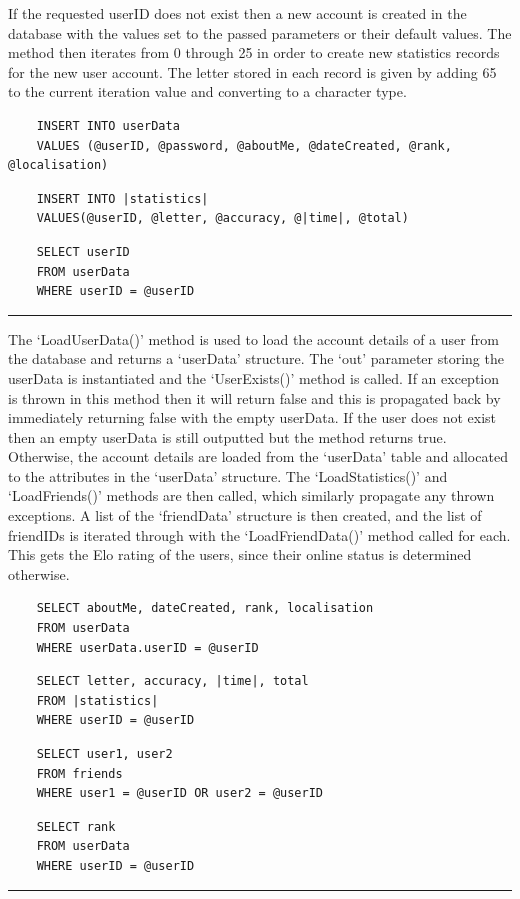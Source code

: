 \documentclass{article}
\begin{document}
If the requested userID does not exist then a new account is created in the database with the values set to the passed parameters or their default values. The method then iterates from 0 through 25 in order to create new statistics records for the new user account. The letter stored in each record is given by adding 65 to the current iteration value and converting to a character type.
\begin{verbatim}
    INSERT INTO userData
    VALUES (@userID, @password, @aboutMe, @dateCreated, @rank, @localisation)
\end{verbatim}
\begin{verbatim}
    INSERT INTO |statistics|
    VALUES(@userID, @letter, @accuracy, @|time|, @total)
\end{verbatim}
\begin{verbatim}
    SELECT userID
    FROM userData
    WHERE userID = @userID
\end{verbatim}
\begin{center}
\rule{0.5\linewidth}{0.4pt}
\end{center}

The `LoadUserData()' method is used to load the account details of a user from the database and returns a `userData' structure. The `out' parameter storing the userData is instantiated and the `UserExists()' method is called. If an exception is thrown in this method then it will return false and this is propagated back by immediately returning false with the empty userData. If the user does not exist then an empty userData is still outputted but the method returns true. \\

Otherwise, the account details are loaded from the `userData' table and allocated to the attributes in the `userData' structure. The `LoadStatistics()' and `LoadFriends()' methods are then called, which similarly propagate any thrown exceptions. A list of the `friendData' structure is then created, and the list of friendIDs is iterated through with the `LoadFriendData()' method called for each. This gets the Elo rating of the users, since their online status is determined otherwise.
\begin{verbatim}
    SELECT aboutMe, dateCreated, rank, localisation
    FROM userData
    WHERE userData.userID = @userID
\end{verbatim}
\begin{verbatim}
    SELECT letter, accuracy, |time|, total
    FROM |statistics|
    WHERE userID = @userID
\end{verbatim}
\begin{verbatim}
    SELECT user1, user2
    FROM friends
    WHERE user1 = @userID OR user2 = @userID
\end{verbatim}
\begin{verbatim}
    SELECT rank
    FROM userData
    WHERE userID = @userID
\end{verbatim}
\begin{center}
\rule{0.5\linewidth}{0.4pt}
\end{center}
\end{document}
